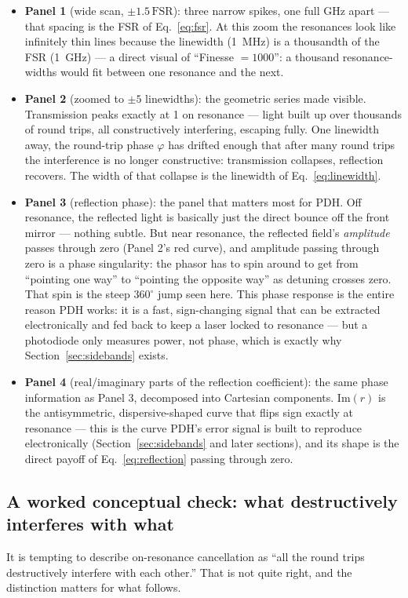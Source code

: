 \documentclass[9pt]{article}
\begin{document}
\begin{itemize}
\item \textbf{Panel 1} (wide scan, $\pm1.5\,\mathrm{FSR}$): three narrow
spikes, one full \si{\giga\hertz} apart --- that spacing is the FSR of
Eq.~\eqref{eq:fsr}. At this zoom the resonances look like infinitely thin
lines because the linewidth (\SI{1}{\mega\hertz}) is a thousandth of the FSR
(\SI{1}{\giga\hertz}) --- a direct visual of ``Finesse $=1000$'': a thousand
resonance-widths would fit between one resonance and the next.
\item \textbf{Panel 2} (zoomed to $\pm5$ linewidths): the geometric series
made visible. Transmission peaks exactly at 1 on resonance --- light built up
over thousands of round trips, all constructively interfering, escaping
fully. One linewidth away, the round-trip phase $\varphi$ has drifted enough
that after many round trips the interference is no longer constructive:
transmission collapses, reflection recovers. The width of that collapse is
the linewidth of Eq.~\eqref{eq:linewidth}.
\item \textbf{Panel 3} (reflection phase): the panel that matters most for
PDH. Off resonance, the reflected light is basically just the direct bounce
off the front mirror --- nothing subtle. But near resonance, the reflected
field's \emph{amplitude} passes through zero (Panel 2's red curve), and
amplitude passing through zero is a phase singularity: the phasor has to
spin around to get from ``pointing one way'' to ``pointing the opposite
way'' as detuning crosses zero. That spin is the steep $360^\circ$ jump seen
here. This phase response is the entire reason PDH works: it is a fast,
sign-changing signal that can be extracted electronically and fed back to
keep a laser locked to resonance --- but a photodiode only measures power,
not phase, which is exactly why Section~\ref{sec:sidebands} exists.
\item \textbf{Panel 4} (real/imaginary parts of the reflection coefficient):
the same phase information as Panel 3, decomposed into Cartesian components.
$\mathrm{Im}(r)$ is the antisymmetric, dispersive-shaped curve that flips
sign exactly at resonance --- this is the curve PDH's error signal is built
to reproduce electronically (Section~\ref{sec:sidebands} and later
sections), and its shape is the direct payoff of Eq.~\eqref{eq:reflection}
passing through zero.
\end{itemize}

\subsection{A worked conceptual check: what destructively interferes with what}
\label{sec:cavity-conceptual-check}
It is tempting to describe on-resonance cancellation as ``all the round
trips destructively interfere with each other.'' That is not quite right,
and the distinction matters for what follows.
\end{document}
